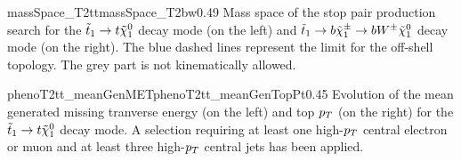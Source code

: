 

                     {massSpace_T2tt}{massSpace_T2bw}{0.49}
                     {Mass space of the stop pair production search for the $\tilde{t}_1 
                     \rightarrow t \tilde{\chi}_1^0$ decay mode (on the left) and $\tilde{t}_1 
                     \rightarrow b \tilde{\chi}_1^\pm \rightarrow b W^{\pm} \tilde{\chi}_1^0 $ decay 
                     mode (on the right). The blue dashed lines represent the limit for 
                     the off-shell topology. The grey part is not kinematically allowed.}
 
                     {phenoT2tt_meanGenMET}{phenoT2tt_meanGenTopPt}{0.45}
                     {Evolution of the mean generated missing tranverse energy (on the left) 
                     and top $p_T$ (on the right) for the $\tilde{t}_1 \rightarrow t \tilde{\chi}_1^0$ 
                     decay mode. A selection requiring at least one high-$p_T$ central 
                     electron or muon and at least three high-$p_T$ central jets has been 
                     applied.}
    
